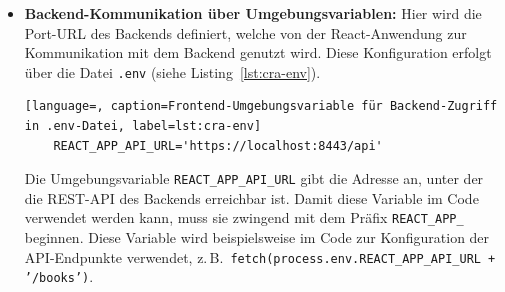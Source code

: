 \begin{itemize}
\begin{lstlisting}[language=Java, caption=Einstiegspunkt der React-Anwendung, label=lst:react-index, breaklines=true]
	const stripePromise = loadStripe('my_stripe_public_key');
	
	const root = ReactDOM.createRoot(
	document.getElementById('root') as HTMLElement
	);
	root.render(
	<BrowserRouter>
	<Elements stripe={stripePromise}>
	<App />
	</Elements>
	</BrowserRouter>
	);
	\end{lstlisting}
	
	Die Datei \texttt{index.tsx} dient als zentrales Einstiegsskript für die React-Anwendung. Sie importiert zunächst alle notwendigen Module und Abhängigkeiten wie React selbst, den ReactDOM-Client, die globale CSS-Datei, die Hauptkomponente \texttt{App} sowie zusätzliche Bibliotheken für Routing (\texttt{react-router-dom}), UI-Icons (Bootstrap Icons), Zahlungsintegration (Stripe) und Internationalisierung (\texttt{i18n}).
	
	Im nächsten Schritt wird Stripe über \texttt{loadStripe} mit dem öffentlichen Schlüssel initialisiert und in einer Promise-Variable gespeichert. Anschließend wird mithilfe von \texttt{ReactDOM.createRoot(...)} eine sogenannte „Root“-Instanz erzeugt, welche das \texttt{<div>} mit der ID \texttt{root} im HTML-Dokument referenziert. Das \texttt{<div>} mit der ID \texttt{root} befindet sich in der Datei \texttt{public/index.html}.
	
	Im letzten Schritt erfolgt das eigentliche Rendern der Anwendung. Hierbei wird die Komponente \texttt{<App />} in den Kontext von \texttt{<BrowserRouter>} und \texttt{<Elements>} eingebettet, um Routing- und Zahlungsfunktionen global bereitzustellen.
	
\item \textbf{Backend-Kommunikation über Umgebungsvariablen:} Hier wird die Port-URL des Backends definiert, welche von der React-Anwendung zur Kommunikation mit dem Backend genutzt wird. Diese Konfiguration erfolgt über die Datei \texttt{.env} (siehe Listing~\ref{lst:cra-env}).  

\begin{lstlisting}[language=, caption=Frontend-Umgebungsvariable für Backend-Zugriff in .env-Datei, label=lst:cra-env]
	REACT_APP_API_URL='https://localhost:8443/api'
\end{lstlisting}

Die Umgebungsvariable \texttt{REACT\_APP\_API\_URL} gibt die Adresse an, unter der die REST-API des Backends erreichbar ist. Damit diese Variable im Code verwendet werden kann, muss sie zwingend mit dem Präfix \texttt{REACT\_APP\_} beginnen.
Diese Variable wird beispielsweise im Code zur Konfiguration der API-Endpunkte verwendet, z.\,B.\ \texttt{fetch(process.env.REACT\_APP\_API\_URL + '/books')}.
	
\end{itemize}

